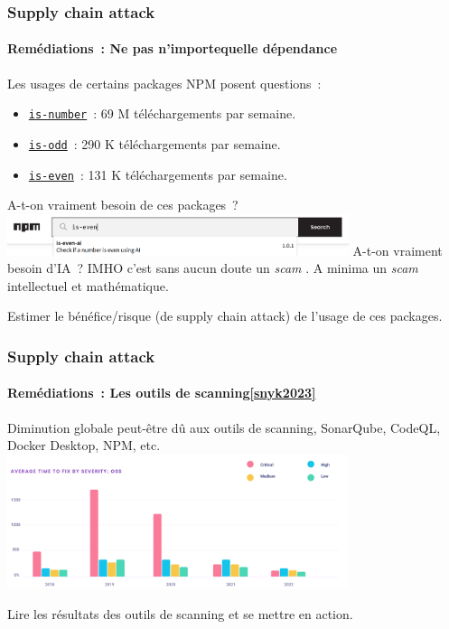 \documentclass{beamer}
\begin{document}
    \begin{frame}
        \frametitle{Supply chain attack}
        \framesubtitle{Remédiations~: Ne pas  n'importequelle dépendance}
        \transdissolve
        Les usages de certains packages NPM posent questions~:
        \begin{itemize}
            \item \href{https://www.npmjs.com/package/is-number}{\lstinline{is-number}}~: 69 M téléchargements par semaine.
            \item \href{https://www.npmjs.com/package/is-odd}{\lstinline{is-odd}}~: 290 K téléchargements par semaine.
            \item \href{https://www.npmjs.com/package/is-even}{\lstinline{is-even}}~: 131 K téléchargements par semaine.
        \end{itemize}
        A-t-on vraiment besoin de ces packages~?
        \bigbreak
        \centering
        \includegraphics[width=10cm]{image/ai-everywhere}
        \flushleft
        \bigbreak
        A-t-on vraiment besoin d'IA~?
        \bigbreak
        IMHO c'est sans aucun doute un \textit{scam} .
        A minima un \textit{scam} intellectuel et mathématique.
        \begin{dangercolorbox}
            Estimer le bénéfice/risque (de supply chain attack) de l'usage de ces packages.
        \end{dangercolorbox}
    \end{frame}

    \begin{frame}
        \frametitle{Supply chain attack}
        \framesubtitle{Remédiations~: Les outils de scanning\cref{snyk2023}}
        \transdissolve
        Diminution globale peut-être dû aux outils de scanning, SonarQube, CodeQL, Docker Desktop, NPM, etc.
        \bigbreak
        \centering
        \includegraphics[width=10cm]{image/vuln-time-to-fix}
        \flushleft
        \begin{dangercolorbox}
            Lire les résultats des outils de scanning et se mettre en action.
        \end{dangercolorbox}
    \end{frame}
\end{document}
